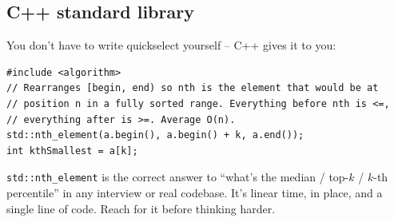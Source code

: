 \documentclass[11pt]{article}
\begin{document}
\subsection*{C++ standard library}

You don't have to write quickselect yourself -- C++ gives it to you:

\begin{lstlisting}[basicstyle=\ttfamily\small,frame=single]
#include <algorithm>
// Rearranges [begin, end) so nth is the element that would be at
// position n in a fully sorted range. Everything before nth is <=,
// everything after is >=. Average O(n).
std::nth_element(a.begin(), a.begin() + k, a.end());
int kthSmallest = a[k];
\end{lstlisting}

\begin{ideabox}
\texttt{std::nth\_element} is the correct answer to ``what's the median / top-$k$ / $k$-th percentile'' in any interview or real codebase. It's linear time, in place, and a single line of code. Reach for it before thinking harder.
\end{ideabox}
\end{document}
